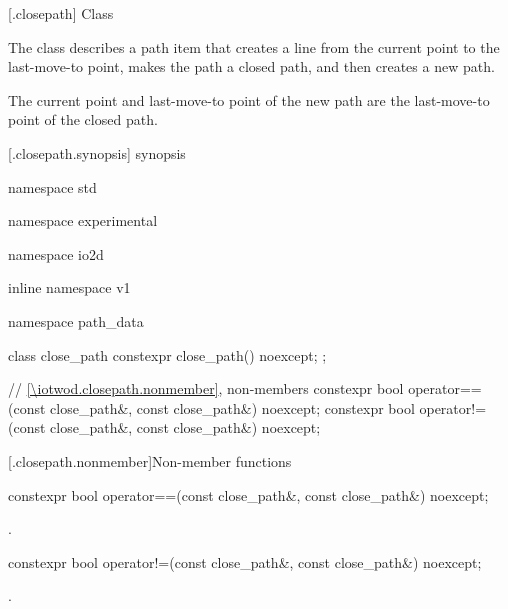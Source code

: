  [\iotwod.closepath] {Class }%

\pnum
{}
The class  describes a path item that creates a line from the current point to the last-move-to point, makes the path a closed path, and then creates a new path.

\pnum
The current point and last-move-to point of the new path are the last-move-to point of the closed path.

 [\iotwod.closepath.synopsis] { synopsis}%

\begin{codeblock}
namespace std { namespace experimental { namespace io2d { inline namespace v1 {
  namespace path_data {
    class close_path {
      constexpr close_path() noexcept;
    };
    
    // \ref{\iotwod.closepath.nonmember}, non-members
    constexpr bool operator==(const close_path&, const close_path&) noexcept;
    constexpr bool operator!=(const close_path&, const close_path&) noexcept;
  }
} } } }
\end{codeblock}

 [\iotwod.closepath.nonmember]{Non-member functions}%

%
\begin{itemdecl}
constexpr bool operator==(const close_path&, const close_path&) noexcept;
\end{itemdecl}
\begin{itemdescr}
\pnum
\returns
{}.
\end{itemdescr}

%
\begin{itemdecl}
constexpr bool operator!=(const close_path&, const close_path&) noexcept;
\end{itemdecl}
\begin{itemdescr}
\pnum
\returns
{}.
\end{itemdescr}
